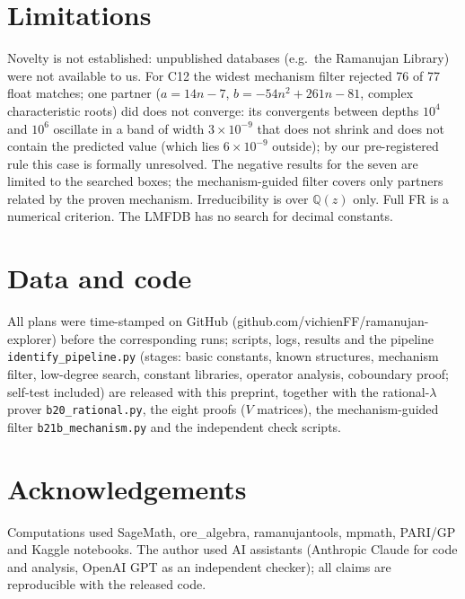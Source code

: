 \documentclass[11pt]{article}
\begin{document}
\section{Limitations}
Novelty is not established: unpublished databases (e.g.\ the Ramanujan Library) were not available to us. For C12 the widest
mechanism filter rejected 76 of 77 float matches; one partner ($a=14n-7$, $b=-54n^2+261n-81$, complex characteristic roots) did
does not converge: its convergents between depths $10^4$ and $10^6$ oscillate in a band of width $3\times10^{-9}$ that does not
shrink and does not contain the predicted value (which lies $6\times10^{-9}$ outside); by our pre-registered rule this case is
formally unresolved. The negative results for the seven are limited to the searched boxes; the mechanism-guided filter covers
only partners related by the proven mechanism. Irreducibility is over
$\mathbb Q(z)$ only. Full FR is a numerical criterion. The LMFDB has no search for decimal constants.

\section*{Data and code}
All plans were time-stamped on GitHub (github.com/vichienFF/ramanujan-explorer) before the corresponding runs; scripts, logs,
results and the pipeline \texttt{identify\_pipeline.py} (stages: basic constants, known structures, mechanism filter, low-degree
search, constant libraries, operator analysis, coboundary proof; self-test included) are released with this preprint, together
with the rational-$\lambda$ prover \texttt{b20\_rational.py}, the eight proofs ($V$ matrices), the mechanism-guided filter \texttt{b21b\_mechanism.py} and the independent check scripts.
\section*{Acknowledgements}
Computations used SageMath, ore\_algebra, ramanujantools, mpmath, PARI/GP and Kaggle notebooks. The author used AI assistants
(Anthropic Claude for code and analysis, OpenAI GPT as an independent checker); all claims are reproducible with the released code.
\end{document}
